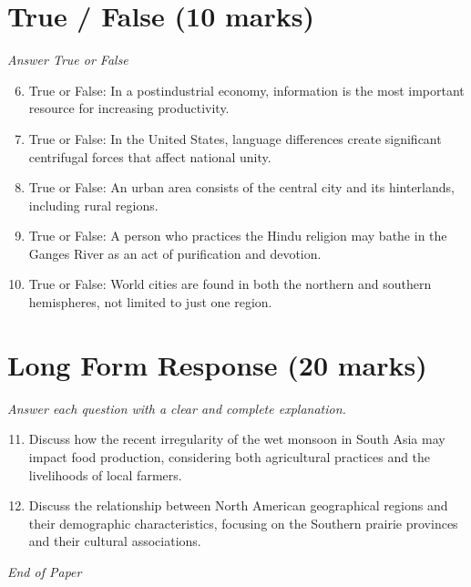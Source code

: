 \documentclass[12pt]{article}
\begin{document}
\section*{True / False (10 marks)}
\textit{Answer True or False}
\begin{enumerate}[label=\arabic*.]
\setcounter{enumi}{5}
\item True or False: In a postindustrial economy, information is the most important resource for increasing productivity.
\item True or False: In the United States, language differences create significant centrifugal forces that affect national unity.
\item True or False: An urban area consists of the central city and its hinterlands, including rural regions.
\item True or False: A person who practices the Hindu religion may bathe in the Ganges River as an act of purification and devotion.
\item True or False: World cities are found in both the northern and southern hemispheres, not limited to just one region.
\end{enumerate}

\section*{Long Form Response (20 marks)}
\textit{Answer each question with a clear and complete explanation.}
\begin{enumerate}[label=\arabic*.]
\setcounter{enumi}{10}
\item Discuss how the recent irregularity of the wet monsoon in South Asia may impact food production, considering both agricultural practices and the livelihoods of local farmers.
\item Discuss the relationship between North American geographical regions and their demographic characteristics, focusing on the Southern prairie provinces and their cultural associations.
\end{enumerate}

\vfill
\noindent\textit{End of Paper}
\end{document}
